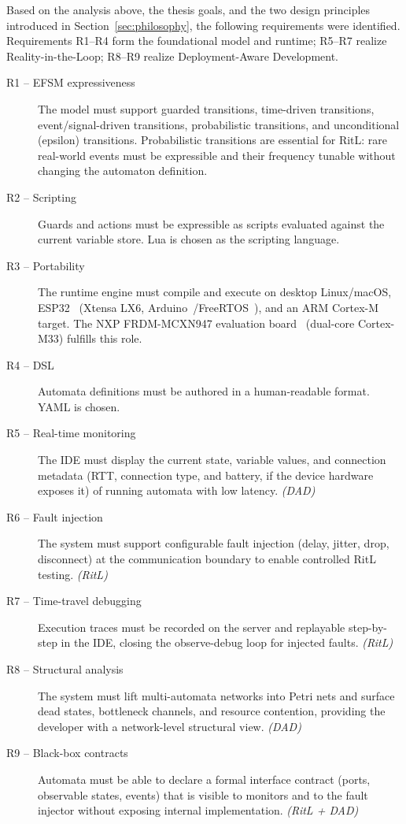 Based on the analysis above, the thesis goals, and the two design principles introduced in Section~\ref{sec:philosophy}, the following requirements were identified. Requirements R1--R4 form the foundational model and runtime; R5--R7 realize Reality-in-the-Loop; R8--R9 realize Deployment-Aware Development.

\begin{description}
  \item[R1 -- EFSM expressiveness] The model must support guarded transitions, time-driven transitions, event/signal-driven transitions, probabilistic transitions, and unconditional (epsilon) transitions. Probabilistic transitions are essential for RitL: rare real-world events must be expressible and their frequency tunable without changing the automaton definition.
  \item[R2 -- Scripting] Guards and actions must be expressible as scripts evaluated against the current variable store. Lua is chosen as the scripting language.
  \item[R3 -- Portability] The runtime engine must compile and execute on desktop Linux/macOS, ESP32~\cite{ESP32TRM} (Xtensa LX6, Arduino~\cite{Arduino}/FreeRTOS~\cite{FreeRTOS}), and an ARM Cortex-M target. The NXP FRDM-MCXN947 evaluation board~\cite{NXPFRDMMCXN947} (dual-core Cortex-M33) fulfills this role.
  \item[R4 -- DSL] Automata definitions must be authored in a human-readable format. YAML is chosen.
  \item[R5 -- Real-time monitoring] The IDE must display the current state, variable values, and connection metadata (RTT, connection type, and battery, if the device hardware exposes it) of running automata with low latency. \emph{(DAD)}
  \item[R6 -- Fault injection] The system must support configurable fault injection (delay, jitter, drop, disconnect) at the communication boundary to enable controlled RitL testing. \emph{(RitL)}
  \item[R7 -- Time-travel debugging] Execution traces must be recorded on the server and replayable step-by-step in the IDE, closing the observe-debug loop for injected faults. \emph{(RitL)}
  \item[R8 -- Structural analysis] The system must lift multi-automata networks into Petri nets and surface dead states, bottleneck channels, and resource contention, providing the developer with a network-level structural view. \emph{(DAD)}
  \item[R9 -- Black-box contracts] Automata must be able to declare a formal interface contract (ports, observable states, events) that is visible to monitors and to the fault injector without exposing internal implementation. \emph{(RitL + DAD)}
\end{description}

